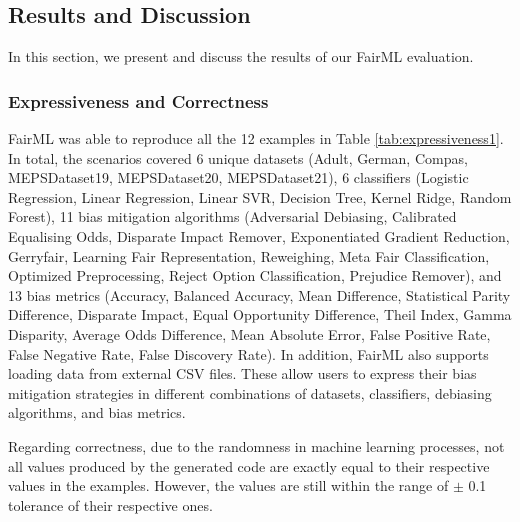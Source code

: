 \documentclass[sigconf,review]{acmart}
\begin{document}
{	\subsection{Results and Discussion}
	\label{sec:result_and_discussion}
	In this section, we present and discuss the results of our FairML evaluation.
	
	\subsubsection{Expressiveness and Correctness}
	\label{sec:expressiveness_and_correctness}
	FairML was able to reproduce all the 12 examples in Table \ref{tab:expressiveness1}.
	In total, the scenarios covered 6 unique datasets 
	(Adult, German, Compas, MEPSDataset19, MEPSDataset20, MEPSDataset21),
	6 classifiers (Logistic Regression, Linear Regression, Linear SVR, Decision Tree, Kernel Ridge, Random Forest), 
	11 bias mitigation algorithms 
	(Adversarial Debiasing, Calibrated Equalising Odds, Disparate Impact Remover, Exponentiated Gradient Reduction, Gerryfair, Learning Fair Representation, Reweighing, Meta Fair Classification, Optimized Preprocessing, Reject Option Classification, Prejudice Remover), 
	and 
	13 bias metrics 
	(Accuracy, Balanced Accuracy, Mean Difference, Statistical Parity Difference, Disparate Impact, Equal Opportunity Difference, Theil Index, Gamma Disparity, Average Odds Difference, Mean Absolute Error, False Positive Rate, False Negative Rate, False Discovery Rate). 
	In addition, FairML also supports loading data from external CSV files. 
	These allow users to express their bias mitigation strategies in different combinations of datasets, classifiers, debiasing algorithms, and bias metrics.
	
	Regarding correctness, due to the randomness in machine learning processes, not all values produced by the generated code are exactly equal to their respective values in the examples. However, the values are still within the range of $\pm$ 0.1 tolerance of their respective ones.
	
}
\end{document}
